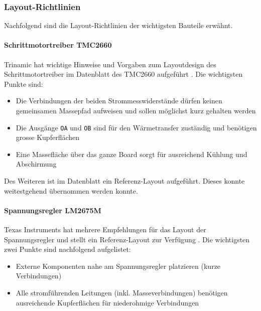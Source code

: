 \subsubsection{Layout-Richtlinien}
\label{sec:LayoutGuidelines}

Nachfolgend sind die Layout-Richtlinien der wichtigsten Bauteile erwähnt.\\


\paragraph{Schrittmotortreiber TMC2660}
Trinamic hat wichtige Hinweise und Vorgaben zum Layoutdesign des Schrittmotortreiber im Datenblatt des TMC2660 aufgeführt \cite{TMC2660}.
Die wichtigsten Punkte sind:

\begin{itemize}
	\item Die Verbindungen der beiden Strommesswiderstände dürfen keinen gemeinsamen Massepfad aufweisen und sollen möglichst kurz gehalten werden
	\item Die Ausgänge \texttt{OA} und \texttt{OB} sind für den Wärmetransfer zuständig und benötigen grosse Kupferflächen
	\item Eine Massefläche über das ganze Board sorgt für ausreichend Kühlung und Abschirmung
\end{itemize}

Des Weiteren ist im Datenblatt ein Referenz-Layout aufgeführt. Dieses konnte weitestgehend übernommen werden konnte.


\paragraph{Spannungsregler LM2675M}
Texas Instruments hat mehrere Empfehlungen für das Layout der Spannungsregler und stellt ein Referenz-Layout zur Verfügung \cite{LM2675M}. Die wichtigsten zwei Punkte sind nachfolgend aufgelistet:

\begin{itemize}
	\item Externe Komponenten nahe am Spannungsregler platzieren (kurze Verbindungen)
	\item Alle stromführenden Leitungen (inkl. Masseverbindungen) benötigen ausreichende Kupferflächen für niederohmige Verbindungen
\end{itemize}

\vspace{3mm}
